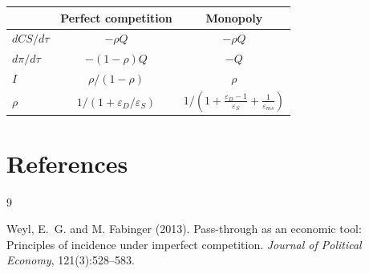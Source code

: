 \documentclass[11pt]{article}
\begin{document}
\begin{center}
\begin{tabular}{lcc}
  & Perfect competition & Monopoly \\
  \hline
  $dCS/d\tau$ & $-\rho Q$ & $-\rho Q$ \\
  $d\pi/d\tau$ & $-(1-\rho)Q$ & $-Q$ \\
  $I$ & $\rho/(1-\rho)$ & $\rho$ \\
  $\rho$ & $1/(1+\varepsilon_D/\varepsilon_S)$
  & $1/(1+\frac{\varepsilon_D-1}{\varepsilon_S}+\frac{1}{\varepsilon_{ms}})$ \\
\end{tabular}
\end{center}

\section*{References}
\begin{thebibliography}{9}

Weyl, E.~G. and M. Fabinger (2013).
\newblock Pass-through as an economic tool: Principles of incidence under
  imperfect competition.
\newblock \emph{Journal of Political Economy}, 121(3):528--583.

\end{thebibliography}
\end{document}
